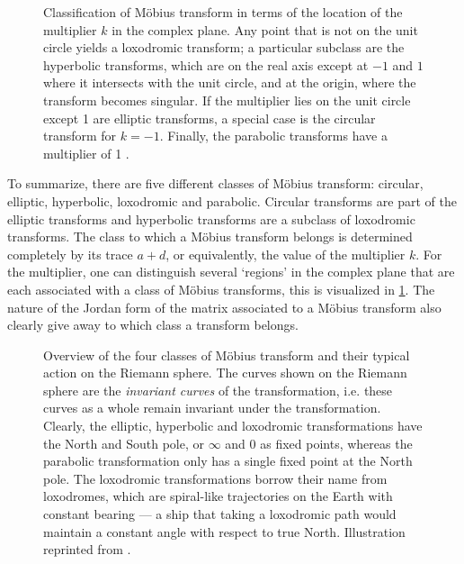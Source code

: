 
\begin{figure}
    \centering
     
    \caption{Classification of Möbius transform in terms of the location of the multiplier \(k\) in the complex plane. Any point that is not on the unit circle yields a loxodromic transform; a particular subclass are the hyperbolic transforms, which are on the real axis except at \(-1\) and \(1\) where it intersects with the unit circle, and at the origin, where the transform becomes singular. If the multiplier lies on the unit circle except 1 are elliptic transforms, a special case is the circular transform for \(k = -1\). Finally, the parabolic transforms have a multiplier of 1 \cite{Needham1997}.}
\end{figure}
To summarize, there are five different classes of Möbius transform: circular, elliptic, hyperbolic, loxodromic and parabolic. Circular transforms are part of the elliptic transforms and hyperbolic transforms are a subclass of loxodromic transforms. The class to which a Möbius transform belongs is determined completely by its trace \(a + d\), or equivalently, the value of the multiplier \(k\). For the multiplier, one can distinguish several `regions' in the complex plane that are each associated with a class of Möbius transforms, this is visualized in \cref{fig:multiplier_regions}. The nature of the Jordan form of the matrix associated to a Möbius transform also clearly give away to which class a transform belongs. 
\begin{figure}
    \centering
    
    \caption{Overview of the four classes of Möbius transform and their typical action on the Riemann sphere. The curves shown on the Riemann sphere are the \emph{invariant curves} of the transformation, i.e. these curves as a whole remain invariant under the transformation. Clearly, the elliptic, hyperbolic and loxodromic transformations have the North and South pole, or \(\infty\) and 0 as fixed points, whereas the parabolic transformation only has a single fixed point at the North pole. The loxodromic transformations borrow their name from loxodromes, which are spiral-like trajectories on the Earth with constant bearing --- a ship that taking a loxodromic path would maintain a constant angle with respect to true North. Illustration reprinted from \citet[p. 78]{Needham2021}.}
    \label{fig:multiplier_regions}
\end{figure}
